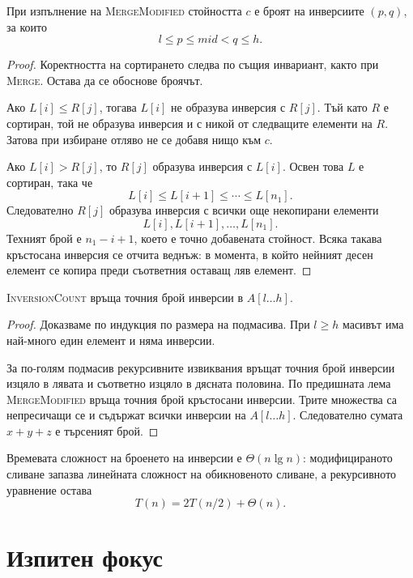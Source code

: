 \begin{lem}
При изпълнение на \textsc{MergeModified} стойността $c$ е броят на инверсиите $(p,q)$, за които
\[
l\leq p\leq mid<q\leq h.
\]
\end{lem}

\begin{proof}
Коректността на сортирането следва по същия инвариант, както при \textsc{Merge}. Остава да се обоснове броячът.

Ако $L[i]\leq R[j]$, тогава $L[i]$ не образува инверсия с $R[j]$. Тъй като $R$ е сортиран, той не образува инверсия и с никой от следващите елементи на $R$. Затова при избиране отляво не се добавя нищо към $c$.

Ако $L[i]>R[j]$, то $R[j]$ образува инверсия с $L[i]$. Освен това $L$ е сортиран, така че
\[
L[i]\leq L[i+1]\leq\cdots\leq L[n_1].
\]
Следователно $R[j]$ образува инверсия с всички още некопирани елементи
\[
L[i],L[i+1],\ldots,L[n_1].
\]
Техният брой е $n_1-i+1$, което е точно добавената стойност. Всяка такава кръстосана инверсия се отчита веднъж: в момента, в който нейният десен елемент се копира преди съответния оставащ ляв елемент.
\end{proof}

\begin{thm}
\textsc{InversionCount} връща точния брой инверсии в $A[l\ldots h]$.
\end{thm}

\begin{proof}
Доказваме по индукция по размера на подмасива. При $l\geq h$ масивът има най-много един елемент и няма инверсии.

За по-голям подмасив рекурсивните извиквания връщат точния брой инверсии изцяло в лявата и съответно изцяло в дясната половина. По предишната лема \textsc{MergeModified} връща точния брой кръстосани инверсии. Трите множества са непресичащи се и съдържат всички инверсии на $A[l\ldots h]$. Следователно сумата $x+y+z$ е търсеният брой.
\end{proof}

\begin{remark}
Времевата сложност на броенето на инверсии е $\Theta(n\lg n)$: модифицираното сливане запазва линейната сложност на обикновеното сливане, а рекурсивното уравнение остава
\[
T(n)=2T(n/2)+\Theta(n).
\]
\end{remark}

\section{Изпитен фокус}\label{s:6.8}

